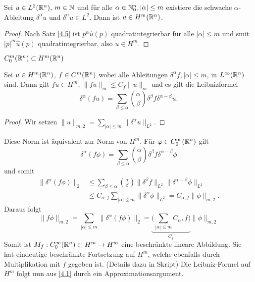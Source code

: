 \documentclass{mycourse}
\begin{document}
\begin{st}\label{4.6}
Sei $u\in L^2(\mathbb{R}^n)$, $m\in \mathbb{N}$ und für alle $\alpha\in \mathbb{N}_0^n, |\alpha|\le m$ existiere die schwache $\alpha$-Ableitung $\delta^\alpha u$ und $\delta^\alpha u\in L^2$. Dann ist $u\in H^m(\mathbb{R}^n)$.  
\end{st}
\begin{proof}
Nach Satz \ref{4.5} ist $p^\alpha \hat u(p)$ quadratintegrierbar für alle $|\alpha|\le m$ und smit $|p|^m \hat u(p)$ quadratintegrierbar, also $u\in H^m$.
\end{proof}

\begin{kor}\label{4.7}
$C_0^m(\mathbb{R}^n) \subset H^m(\mathbb{R}^n)$
\end{kor}

\begin{st}\label{4.8}
Sei $u\in H^m(\mathbb{R}^n)$, $f\in C^m(\mathbb{R}^n)$ wobei alle Ableitungen $\delta^\alpha f, |\alpha| \le m$, in $L^\infty(\mathbb{R}^n)$ sind. Dann gilt $fu \in H^m$,
$\|fu\|_m\le C_f \| u\|_m$ und es gilt die Leibnizformel
\[
\delta^\alpha(fu)=\sum_{\beta \le \alpha} \binom{\alpha}{\beta} \delta^\beta f \delta^{\alpha- \beta} u.
\]
\end{st}
\begin{proof}
Wir setzen $\| u \|_{m,2}=\sum_{|\alpha| \le m} \| \delta^\alpha u\|_{L^2}$.
\end{proof}
Diese Norm ist äquivalent zur Norm von $H^m$. Für $\varphi \in C_0^\infty(\mathbb{R}^n)$ gilt
\begin{equation}\label{4.1}
\delta^\alpha(f\phi) = \sum_{\beta \le \alpha} \binom{\alpha}{\beta} \delta^\beta f \delta^{\alpha-\beta} \phi
\end{equation}
und somit
\begin{align*}
\|\delta^\alpha(f\phi) \|_2 &\le \sum_{\beta \le \alpha} \binom{\alpha}{\beta} \| \delta^\beta f\| _{L^2} \| \delta^{\alpha-\beta} \phi \|_{L^2}\\
&\le C_{\alpha,f} \sum_{|\alpha|\le m} \| \delta^\alpha \phi \|_{L^2}= C_{\alpha,f} \| \phi \|_{m,2}.
\end{align*}
Daraus folgt
\[
\|f\phi\|_{m,2}= \sum_{|\alpha|\le m} \| \delta^\alpha(f\phi)\|_2=\underbrace{\big(\sum_{|\alpha|\le m} C_\alpha,f\big) }_{C_f}  \|\phi\|_{m,2}
\]
Somit ist $M_f:C_0^\infty (\mathbb{R}^n) \subset H^m \to H^m$ eine beschränkte lineare Abbildung. Sie hat eindeutige beschränkte Fortsetzung auf $H^m$, welche ebenfalls durch  Multiplikation mit $f$ gegeben ist. (Details dazu in Skript) Die Leibniz-Formel auf $H^m$ folgt nun aus \eqref{4.1} durch ein Approximationsargument.
\end{document}
